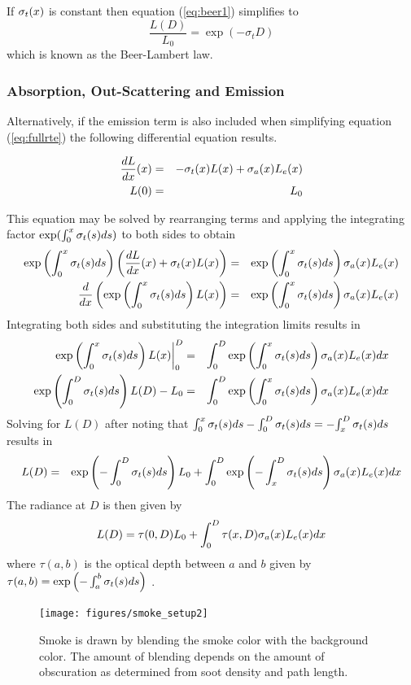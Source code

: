 If $\sigma_t(x)$ is constant then equation (\ref{eq:beer1}) simplifies
to
\begin{equation}
\label{eq:beer2} \frac{L(D)}{L_0}=\exp(-\sigma_t D)
\end{equation}
which is known as the Beer-Lambert law\cite{}.


\subsubsection{Absorption, Out-Scattering and Emission}
Alternatively, if the emission term is also included when
simplifying equation (\ref{eq:fullrte})  the following
differential equation results.

\begin{eqnarray}
\label{eq:simple_rte}
\frac{dL}{dx}(x)&=&-\sigma_t(x) L(x) + \sigma_a(x) L_e(x)\\
 L(0)&=&L_0\nonumber
\end{eqnarray}

This equation may be solved by rearranging terms and applying the
integrating factor $\exp(\int_0^x \sigma_t(s) ds)$ to both sides to
obtain
\begin{eqnarray*}
\exp\left({\int_0^x \sigma_t(s) ds}\right)\left(\frac{dL}{dx}(x)+\sigma_t(x) L(x)\right)&=&  \exp\left({\int_0^x \sigma_t(s) ds}\right)\sigma_a(x) L_e(x)\\
\frac{d}{dx}\left(\exp\left({\int_0^x \sigma_t(s) ds}\right) L(x)\right)&=& \exp\left({\int_0^x \sigma_t(s) ds}\right)\sigma_a(x) L_e(x)
\end{eqnarray*}
Integrating both sides and substituting the integration limits
results in
\begin{eqnarray*}
\left.\exp\left({\int_0^x \sigma_t(s) ds}\right) L(x)\right|_0^D&=& \int_0^D\exp\left({\int_0^x \sigma_t(s) ds}\right)\sigma_a(x) L_e(x) dx \\
\exp\left({\int_0^D \sigma_t(s) ds}\right) L(D)-L_0&=& \int_0^D\exp\left({\int_0^x \sigma_t(s) ds}\right)\sigma_a(x) L_e(x) dx
\end{eqnarray*}
Solving for $L(D)$ after noting that
${\int_0^x \sigma_t(s) ds}-{\int_0^D \sigma_t(s) ds}=-{\int_x^D \sigma_t(s) ds}$ results in
\begin{eqnarray*}
L(D)&=&\exp\left({-\int_0^D \sigma_t(s) ds}\right) L_0+ \int_0^D\exp\left({-\int_x^D \sigma_t(s) ds}\right)\sigma_a(x) L_e(x) dx\\
\end{eqnarray*}
The radiance at $D$ is then given by
\begin{equation}
 L(D)=\tau(0,D)L_0 + \int_0^D\tau(x,D)\sigma_a(x)L_e(x) dx
\end{equation}
where $\tau(a,b)$ is the optical depth between $a$ and $b$ given
by $\tau(a,b)=\exp\left({-\int_a^b \sigma_t(s) ds}\right)$ .

\begin{figure}[\figoptions]
\begin{center}
\texttt{[image: figures/smoke\_setup2]}
\end{center}
\caption {Smoke is drawn by blending the smoke color with the
background color.  The amount of blending depends on the amount of
obscuration as determined from soot density and path length.}
\label{figsmokesetup2}
\end{figure}
